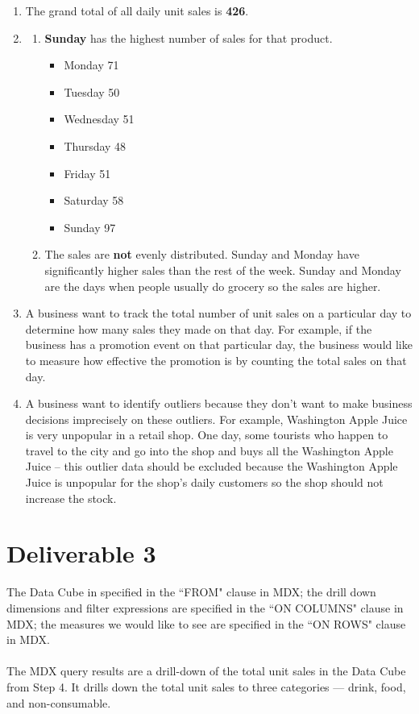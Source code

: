 \documentclass{article}
\begin{document}
\begin{enumerate}
	\item The grand total of all daily unit sales is \textbf{426}.
	\item \begin{enumerate}
			\item \textbf{Sunday} has the highest number of sales for that product.
			\begin{itemize}
				\item Monday 71
				\item Tuesday 50
				\item Wednesday 51
				\item Thursday 48
				\item Friday 51
				\item Saturday 58
				\item Sunday 97
			\end{itemize}
			\item The sales are \textbf{not} evenly distributed. Sunday and Monday have significantly higher sales than the rest of the week. Sunday and Monday are the days when people usually do grocery so the sales are higher.
		\end{enumerate}
	\item A business want to track the total number of unit sales on a particular day to determine how many sales they made on that day. For example, if the business has a promotion event on that particular day, the business would like to measure how effective the promotion is by counting the total sales on that day.
	\item A business want to identify outliers because they don't want to make business decisions imprecisely on these outliers. For example, Washington Apple Juice is very unpopular in a retail shop. One day, some tourists who happen to travel to the city and go into the shop and buys all the Washington Apple Juice -- this outlier data should be excluded because the Washington Apple Juice is unpopular for the shop's daily customers so the shop should not increase the stock.
\end{enumerate}

\section{Deliverable 3}

The Data Cube in specified in the ``FROM" clause in MDX; the drill down dimensions and filter expressions are specified in the ``ON COLUMNS" clause in MDX; the measures we would like to see are specified in the ``ON ROWS" clause in MDX.\\
\\
\noindent The MDX query results are a drill-down of the total unit sales in the Data Cube from Step 4. It drills down the total unit sales to three categories --- drink, food, and non-consumable.
\end{document}
